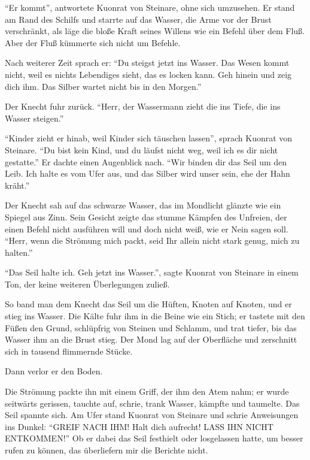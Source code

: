 \enquote{Er kommt}, antwortete \gls{Kuonrat von Steinare}, ohne sich umzusehen. Er stand am Rand des Schilfs und starrte auf das Wasser, die Arme vor der Brust verschränkt, als läge die bloße Kraft seines Willens wie ein Befehl über dem Fluß. Aber der Fluß kümmerte sich nicht um Befehle.

Nach weiterer Zeit sprach er: \enquote{Du steigst jetzt ins Wasser. Das Wesen kommt nicht, weil es nichts Lebendiges sieht, das es locken kann. Geh hinein und zeig dich ihm. Das Silber wartet nicht bis in den Morgen.}

Der \gls{Knecht} fuhr zurück. \enquote{Herr, der Wassermann zieht die ins Tiefe, die ins Wasser steigen.}

\enquote{Kinder zieht er hinab, weil Kinder sich täuschen lassen}, sprach \gls{Kuonrat von Steinare}. \enquote{Du bist kein Kind, und du läufst nicht weg, weil ich es dir nicht gestatte.} Er dachte einen Augenblick nach. \enquote{Wir binden dir das Seil um den Leib. Ich halte es vom Ufer aus, und das Silber wird unser sein, ehe der Hahn kräht.}

Der \gls{Knecht} sah auf das schwarze Wasser, das im Mondlicht glänzte wie ein Spiegel aus Zinn. Sein Gesicht zeigte das stumme Kämpfen des Unfreien, der einen Befehl nicht ausführen will und doch nicht weiß, wie er Nein sagen soll. \enquote{Herr, wenn die Strömung mich packt, seid Ihr allein nicht stark genug, mich zu halten.}

\enquote{Das Seil halte ich. Geh jetzt ins Wasser.}, sagte \gls{Kuonrat von Steinare} in einem Ton, der keine weiteren Überlegungen zuließ.

So band man dem Knecht das Seil um die Hüften, Knoten auf Knoten, und er stieg ins Wasser. Die Kälte fuhr ihm in die Beine wie ein Stich; er tastete mit den Füßen den Grund, schlüpfrig von Steinen und Schlamm, und trat tiefer, bis das Wasser ihm an die Brust stieg. Der Mond lag auf der Oberfläche und zerschnitt sich in tausend flimmernde Stücke.

Dann verlor er den Boden.

Die Strömung packte ihn mit einem Griff, der ihm den Atem nahm; er wurde seitwärts gerissen, tauchte auf, schrie, trank Wasser, kämpfte und taumelte. Das Seil spannte sich. Am Ufer stand \gls{Kuonrat von Steinare} und schrie Anweisungen ins Dunkel: \enquote{GREIF NACH IHM! Halt dich aufrecht! LASS IHN NICHT ENTKOMMEN!} Ob er dabei das Seil festhielt oder losgelassen hatte, um besser rufen zu können, das überliefern mir die Berichte nicht.

